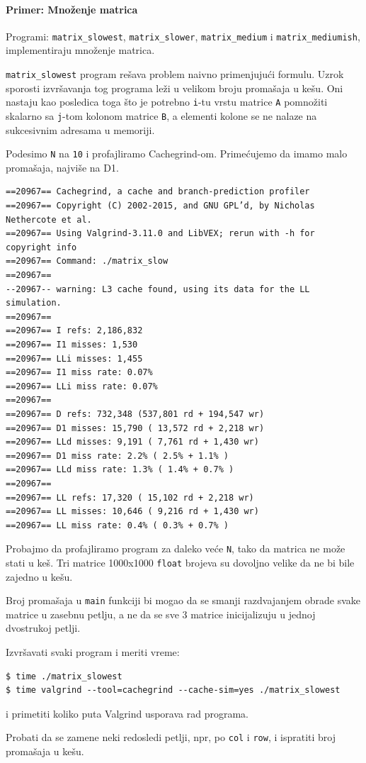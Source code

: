 \paragraph{Primer: Množenje matrica}\label{primer-mnoux17eenje-matrica}

Programi: \texttt{matrix\_slowest}, \texttt{matrix\_slower}, \texttt{matrix\_medium} i \texttt{matrix\_mediumish}, implementiraju množenje matrica.

\texttt{matrix\_slowest} program rešava problem naivno primenjujući formulu. Uzrok sporosti izvršavanja tog programa leži u velikom broju promašaja u kešu. Oni nastaju kao posledica toga što je potrebno \texttt{i}-tu vrstu matrice \texttt{A} pomnožiti skalarno sa \texttt{j}-tom kolonom matrice \texttt{B}, a elementi kolone se ne nalaze na sukcesivnim adresama u memoriji.

Podesimo \texttt{N} na \texttt{10} i profajliramo Cachegrind-om. Primećujemo da imamo malo promašaja, najviše na D1.

\begin{verbatim}
==20967== Cachegrind, a cache and branch-prediction profiler
==20967== Copyright (C) 2002-2015, and GNU GPL’d, by Nicholas Nethercote et al.
==20967== Using Valgrind-3.11.0 and LibVEX; rerun with -h for copyright info
==20967== Command: ./matrix_slow
==20967==
--20967-- warning: L3 cache found, using its data for the LL simulation.
==20967==
==20967== I refs: 2,186,832
==20967== I1 misses: 1,530
==20967== LLi misses: 1,455
==20967== I1 miss rate: 0.07%
==20967== LLi miss rate: 0.07%
==20967==
==20967== D refs: 732,348 (537,801 rd + 194,547 wr)
==20967== D1 misses: 15,790 ( 13,572 rd + 2,218 wr)
==20967== LLd misses: 9,191 ( 7,761 rd + 1,430 wr)
==20967== D1 miss rate: 2.2% ( 2.5% + 1.1% )
==20967== LLd miss rate: 1.3% ( 1.4% + 0.7% )
==20967==
==20967== LL refs: 17,320 ( 15,102 rd + 2,218 wr)
==20967== LL misses: 10,646 ( 9,216 rd + 1,430 wr)
==20967== LL miss rate: 0.4% ( 0.3% + 0.7% )
\end{verbatim}

Probajmo da profajliramo program za daleko veće \texttt{N}, tako da matrica ne može stati u keš. Tri matrice 1000x1000 \texttt{float} brojeva su dovoljno velike da ne bi bile zajedno u kešu.

Broj promašaja u \texttt{main} funkciji bi mogao da se smanji razdvajanjem obrade svake matrice u zasebnu petlju, a ne da se sve 3 matrice inicijalizuju u jednoj dvostrukoj petlji.

Izvršavati svaki program i meriti vreme:

\begin{verbatim}
$ time ./matrix_slowest
$ time valgrind --tool=cachegrind --cache-sim=yes ./matrix_slowest
\end{verbatim}

i primetiti koliko puta Valgrind usporava rad programa.

Probati da se zamene neki redosledi petlji, npr, po \texttt{col} i \texttt{row}, i ispratiti broj promašaja u kešu.
